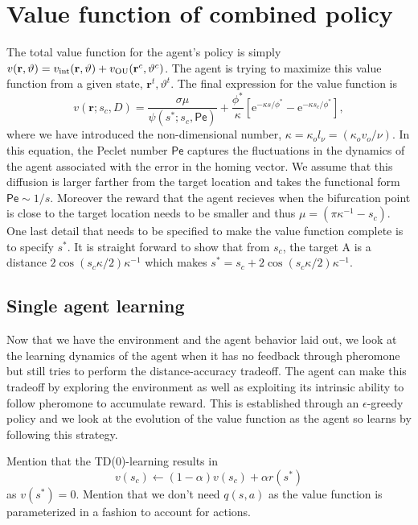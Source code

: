 \documentclass[%
reprint,
superscriptaddress,
floatfix,
amsmath,
amssymb,
aps,
notitlepage
]{revtex4-1}
\def\e{\text{e}}
\def\r{\mathbf{r}}
\def\theta{\vartheta}
\def\Pe{\mathsf{Pe}}
\begin{document}
\section*{Value function of combined policy}
The total value function for the agent's policy is simply $v(\r, \theta) = v_{\rm int}(\r, \theta) + v_{\rm OU}(\r^c, \theta^c)$.
The agent is trying to maximize this value function from a given state, $\r^t, \theta^t$. The final expression
for the value function is
\[
    v(\r; s_c, D) = \frac{\sigma \mu}{\psi(s^*; s_c, \Pe)} + \frac{\phi^*}{\kappa} [ \e^{-\kappa s/\phi^*} - \e^{-\kappa s_c/\phi^*}],
\]
where we have introduced the non-dimensional number, $\kappa = \kappa_o l_\nu = (\kappa_o v_o/\nu)$.
In this equation, the Peclet number $\Pe$ captures the fluctuations in the dynamics of the agent
associated with the error in the homing vector. We assume that this diffusion is larger farther
from the target location and takes the functional form $\Pe \sim 1/s$. Moreover the reward that the agent recieves
when the bifurcation point is close to the target location needs to be smaller and thus $\mu = (\pi\kappa^{-1} -s_c)$.
One last detail that needs to be specified to make the value function complete is to specify $s^*$. It is straight
forward to show that from $s_c$, the target A is a distance $2 \cos(s_c\kappa/2)\kappa^{-1}$ which makes
$s^* = s_c + 2 \cos(s_c\kappa/2)\kappa^{-1}$.

\subsection*{Single agent learning}
Now that we have the environment and the agent behavior laid out, we look at the learning dynamics of the agent
when it has no feedback through pheromone but still tries to perform the distance-accuracy tradeoff. The agent can
make this tradeoff by exploring the environment as well as exploiting its intrinsic ability to follow pheromone to
accumulate reward. This is established through an $\epsilon$-greedy policy and we look at the evolution of the value
function as the agent so learns by following this strategy.

Mention that the TD(0)-learning results in
\[
    v(s_c) \leftarrow (1-\alpha) v(s_c) + \alpha r(s^*)
\]
as $v(s^*) = 0$. Mention that we don't need $q(s, a)$ as the value function is parameterized in a fashion to account for
actions.
\end{document}
